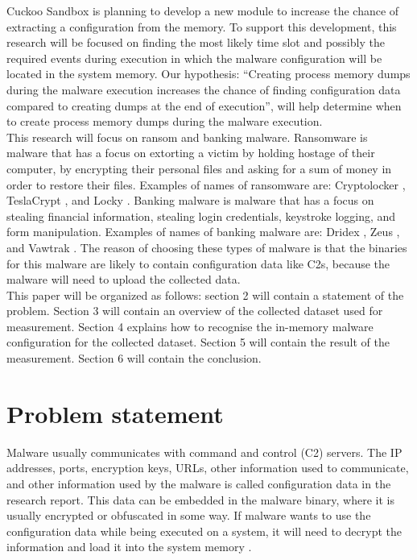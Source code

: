 \documentclass[conference]{IEEEtran}
\begin{document}
Cuckoo Sandbox is planning to develop a new module to increase the chance of extracting a configuration from the memory. To support this development, this research will be focused on finding the most likely time slot and  possibly  the required events during execution in which the malware configuration will be located in the system memory. 
Our hypothesis: “Creating process memory dumps during the malware execution increases the chance of finding \Gls{configuration data} compared to creating dumps at the end of execution”, will help determine when to create process memory dumps during the malware execution.\\

This research will focus on ransom and banking malware. Ransomware is malware that has a focus on extorting a victim by holding hostage of their computer, by encrypting their personal files and asking for a sum of money in order to restore their files. Examples of names of ransomware are: Cryptolocker \cite{tran-cryptolocker}, TeslaCrypt \cite{wyke-currans}, and Locky \cite{long-locky}.
Banking malware is malware that has a focus on stealing financial information, stealing login credentials, keystroke logging, and form manipulation. Examples of names of banking malware are: Dridex \cite{brien-dridex}, Zeus \cite{wyke-zeus}, and Vawtrak \cite{kroustek-vawtrak}. The reason of choosing these types of malware is that the binaries  for this malware are likely to contain \Gls{configuration data} like \Gls{C2}s, because the malware will need to upload the collected data.\\

This paper will be organized as follows:  section 2 will contain a statement of the problem. Section 3 will contain an overview of the collected dataset  used for measurement. Section 4 explains how to recognise the in-memory malware configuration for the collected dataset. Section 5 will contain the result of the measurement. Section 6 will contain the conclusion.\\


\section{Problem statement}

Malware usually communicates with command and control (\Gls{C2}) servers. The IP addresses, ports, encryption keys, URLs, other information used to communicate, and other information used by the malware is called \Gls{configuration data} in the research report. This data can be embedded in the malware binary, where it is usually encrypted or obfuscated in some way. If malware wants to use the \Gls{configuration data} while being executed on a system, it will need to decrypt the information and load it into the system memory \cite{wyke-confextract}.\\
\end{document}
